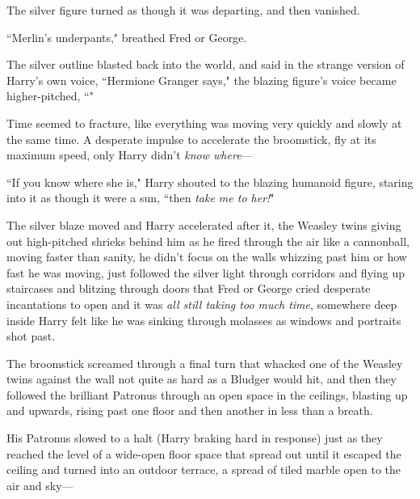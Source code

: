 The silver figure turned as though it was departing, and then vanished.

``Merlin's underpants," breathed Fred or George.

The silver outline blasted back into the world, and said in the strange version of Harry's own voice, ``Hermione Granger says," the blazing figure's voice became higher-pitched, ``"

Time seemed to fracture, like everything was moving very quickly and slowly at the same time. A desperate impulse to accelerate the broomstick, fly at its maximum speed, only Harry didn't \emph{know where}—

``If you know where she is," Harry shouted to the blazing humanoid figure, staring into it as though it were a sun, ``then \emph{take me to her!}"

The silver blaze moved and Harry accelerated after it, the Weasley twins giving out high-pitched shrieks behind him as he fired through the air like a cannonball, moving faster than sanity, he didn't focus on the walls whizzing past him or how fast he was moving, just followed the silver light through corridors and flying up staircases and blitzing through doors that Fred or George cried desperate incantations to open and it was \emph{all still taking too much time}, somewhere deep inside Harry felt like he was sinking through molasses as windows and portraits shot past.

The broomstick screamed through a final turn that whacked one of the Weasley twins against the wall not quite as hard as a Bludger would hit, and then they followed the brilliant Patronus through an open space in the ceilings, blasting up and upwards, rising past one floor and then another in less than a breath.

His Patronus slowed to a halt (Harry braking hard in response) just as they reached the level of a wide-open floor space that spread out until it escaped the ceiling and turned into an outdoor terrace, a spread of tiled marble open to the air and sky—

